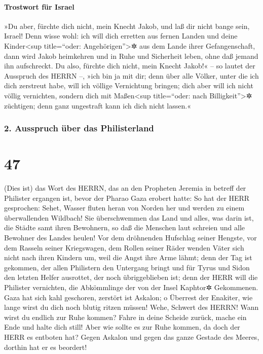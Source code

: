 \hypertarget{trostwort-fuxfcr-israel}{%
\paragraph{Trostwort für Israel}\label{trostwort-fuxfcr-israel}}

»Du aber, fürchte dich nicht, mein Knecht Jakob, und laß
dir nicht bange sein, Israel! Denn wisse wohl: ich will dich erretten
aus fernen Landen und deine Kinder\textless sup title=``oder:
Angehörigen''\textgreater✲ aus dem Lande ihrer Gefangenschaft, dann wird
Jakob heimkehren und in Ruhe und Sicherheit leben, ohne daß jemand ihn
aufschreckt. Du also, fürchte dich nicht, mein Knecht
Jakob!« -- so lautet der Ausspruch des HERRN --, »ich bin ja mit dir;
denn über alle Völker, unter die ich dich zerstreut habe, will ich
völlige Vernichtung bringen; dich aber will ich nicht völlig vernichten,
sondern dich mit Maßen\textless sup title=``oder: nach
Billigkeit''\textgreater✲ züchtigen; denn ganz ungestraft kann ich dich
nicht lassen.«

\hypertarget{ausspruch-uxfcber-das-philisterland}{%
\subsubsection{2. Ausspruch über das
Philisterland}\label{ausspruch-uxfcber-das-philisterland}}

\hypertarget{section-46}{%
\section{47}\label{section-46}}

(Dies ist) das Wort des HERRN, das an den Propheten
Jeremia in betreff der Philister ergangen ist, bevor der Pharao Gaza
erobert hatte: So hat der HERR gesprochen: Sehet, Wasser
fluten heran von Norden her und werden zu einem überwallenden Wildbach!
Sie überschwemmen das Land und alles, was darin ist, die Städte samt
ihren Bewohnern, so daß die Menschen laut schreien und alle Bewohner des
Landes heulen! Vor dem dröhnenden Hufschlag seiner
Hengste, vor dem Rasseln seiner Kriegswagen, dem Rollen seiner Räder
wenden Väter sich nicht nach ihren Kindern um, weil die Angst ihre Arme
lähmt; denn der Tag ist gekommen, der allen Philistern den
Untergang bringt und für Tyrus und Sidon den letzten Helfer ausrottet,
der noch übriggeblieben ist; denn der HERR will die Philister
vernichten, die Abkömmlinge der von der Insel Kaphtor✲ Gekommenen.
Gaza hat sich kahl geschoren, zerstört ist Askalon; o
Überrest der Enakiter, wie lange wirst du dich noch blutig ritzen
müssen! Wehe, Schwert des HERRN! Wann wirst du endlich zur
Ruhe kommen? Fahre in deine Scheide zurück, mache ein Ende und halte
dich still! Aber wie sollte es zur Ruhe kommen, da doch
der HERR es entboten hat? Gegen Askalon und gegen das ganze Gestade des
Meeres, dorthin hat er es beordert!


